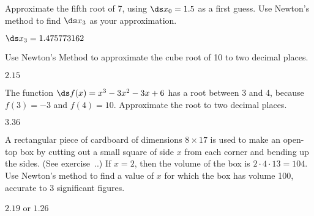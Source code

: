 \begin{exercises}

\exercise Approximate the fifth root of 7, using $\ds x_0=1.5$ as a
first guess. Use Newton's method to find $\ds x_3$ as your
approximation.  
\begin{answer} $\ds x_3=1.475773162$ 
\end{answer}

\exercise Use Newton's Method to approximate the cube root of 10 to
two decimal places.
\begin{answer} $2.15$
\end{answer}

\exercise The function 
$\ds f(x)=x^3-3x^2-3x+6$ has a root between 3 and 4, because
$f(3)=-3$ and $f(4)=10$. Approximate the root to two decimal places.
\begin{answer}  $3.36$
\end{answer}

\exercise A rectangular piece of cardboard of dimensions $8\times 17$
is used to make an open-top box by cutting out a small square of side
$x$ from each corner and bending up the sides.  (See
exercise~..)
If $x=2$, then the volume of the box is $2\cdot 4\cdot 13=104$.  Use
Newton's method to find a value of $x$ for which the box has volume
100, accurate to 3 significant figures.  
\begin{answer} $2.19$ or $1.26$
\end{answer}


\end{exercises}
